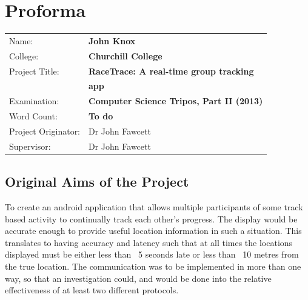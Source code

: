 \cleardoublepage


\setcounter{page}{1}
\pagestyle{plain}

\chapter*{Proforma}

{\large
\begin{tabular}{ll}
Name:               & \bf John Knox                                 \\
College:            & \bf Churchill College                         \\
Project Title:      & \bf RaceTrace: A real-time group tracking                   \\
                    & \bf app                        \\
Examination:        & \bf Computer Science Tripos, Part II (2013)   \\
Word Count:         & \bf To do\footnotemark[1]                     \\
Project Originator: & Dr John Fawcett                               \\
Supervisor:         & Dr John Fawcett                               \\ 
\end{tabular}
}


\section*{Original Aims of the Project}

To create an android application that allows multiple participants of some track based activity to continually track each other's progress. The display would be accurate enough to provide useful location information in such a situation. This translates to having accuracy and latency such that at all times the locations displayed must be either less than ~5 seconds late or less than ~10 metres from the true location.
The communication was to be implemented in more than one way, so that an investigation could, and would be done into the relative effectiveness of at least two different protocols.


